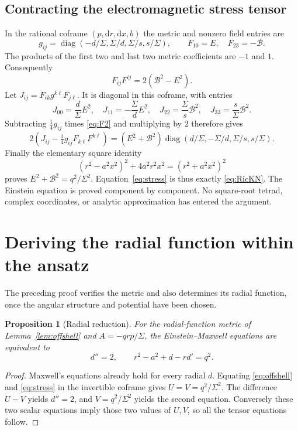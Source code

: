 \documentclass[11pt,a4paper]{article}
\numberwithin{equation}{section}
\newtheorem{proposition}[theorem]{Proposition}
\theoremstyle{definition}\newtheorem{definition}[theorem]{Definition}
\theoremstyle{remark}\newtheorem{remark}[theorem]{Remark}
\newcommand{\dd}{\mathrm{d}}
\newcommand{\calB}{\mathcal{B}}
\begin{document}
\subsection{Contracting the electromagnetic stress tensor}
In the rational coframe $(p,\dd r,\dd x,b)$ the metric and nonzero field entries are
\[
 g_{ij}=\operatorname{diag}(-d/\Sigma,\Sigma/d,\Sigma/s,s/\Sigma),
 \qquad F_{10}=E,\quad F_{23}=-\calB.
\]
The products of the first two and last two metric coefficients are $-1$ and $1$. Consequently
\begin{equation}\label{eq:F2}
 F_{ij}F^{ij}=2(\calB^2-E^2).
\end{equation}
Let $J_{ij}=F_{ik}g^{k\ell}F_{j\ell}$. It is diagonal in this coframe, with entries
\[
 J_{00}=\frac d\Sigma E^2,\quad J_{11}=-\frac\Sigma d E^2,
 \quad J_{22}=\frac\Sigma s\calB^2,\quad J_{33}=\frac s\Sigma\calB^2.
\]
Subtracting $\tfrac14g_{ij}$ times \eqref{eq:F2} and multiplying by $2$ therefore gives
\begin{equation}\label{eq:stress}
 2\left(J_{ij}-\tfrac14g_{ij}F_{k\ell}F^{k\ell}\right)
 =(E^2+\calB^2)\operatorname{diag}
       (d/\Sigma,-\Sigma/d,\Sigma/s,s/\Sigma).
\end{equation}
Finally the elementary square identity
\begin{equation}\label{eq:sumSquares}
 (r^2-a^2x^2)^2+4a^2r^2x^2=(r^2+a^2x^2)^2
\end{equation}
proves $E^2+\calB^2=q^2/\Sigma^2$. Equation~\eqref{eq:stress} is thus exactly \eqref{eq:RicKN}. The Einstein equation is proved component by component. No square-root tetrad, complex coordinates, or analytic approximation has entered the argument.

\section{Deriving the radial function within the ansatz}\label{sec:derive}

The preceding proof verifies the metric and also determines its radial function, once the angular structure and potential have been chosen.

\begin{proposition}[Radial reduction]\label{prop:radial}
For the radial-function metric of Lemma~\ref{lem:offshell} and $A=-qrp/\Sigma$, the Einstein--Maxwell equations are equivalent to
\begin{equation}\label{eq:radial}
 d''=2,\qquad r^2-a^2+d-rd'=q^2.
\end{equation}
\end{proposition}
\begin{proof}
Maxwell's equations already hold for every radial $d$. Equating \eqref{eq:offshell} and \eqref{eq:stress} in the invertible coframe gives $U=V=q^2/\Sigma^2$. The difference $U-V$ yields $d''=2$, and $V=q^2/\Sigma^2$ yields the second equation. Conversely these two scalar equations imply those two values of $U,V$, so all the tensor equations follow.
\end{proof}
\end{document}
